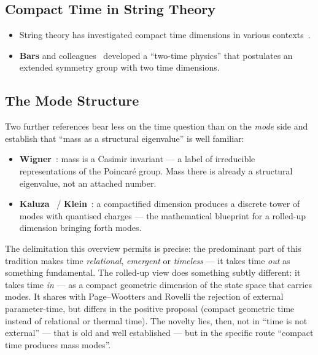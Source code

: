 \documentclass[11pt,a4paper]{article}
\begin{document}
\subsection{Compact Time in String Theory}
\begin{itemize}[leftmargin=1.4em,itemsep=0.25em]
 \item String theory has investigated compact time dimensions in various contexts~\cite{GreenSchwarzWitten1987,Polchinski1998}.
 \item \textbf{Bars} and colleagues~\cite{Bars1997,Bars2012} developed a ``two-time physics'' that postulates an extended symmetry group with two time dimensions.
\end{itemize}

\subsection{The Mode Structure}
Two further references bear less on the time question than on the \emph{mode} side and establish that ``mass as a structural eigenvalue'' is well familiar:
\begin{itemize}[leftmargin=1.4em,itemsep=0.25em]
 \item \textbf{Wigner}~\cite{Wigner1939}: mass is a Casimir invariant --- a label of irreducible representations of the Poincaré group. Mass there is already a structural eigenvalue, not an attached number.
 \item \textbf{Kaluza}~\cite{Kaluza1921} / \textbf{Klein}~\cite{Klein1926}: a compactified dimension produces a discrete tower of modes with quantised charges --- the mathematical blueprint for a rolled-up dimension bringing forth modes.
\end{itemize}

The delimitation this overview permits is precise: the predominant part of this tradition makes time \emph{relational}, \emph{emergent} or \emph{timeless} --- it takes time \emph{out} as something fundamental. The rolled-up view does something subtly different: it takes time \emph{in} --- as a compact geometric dimension of the state space that carries modes. It shares with Page--Wootters and Rovelli the rejection of external parameter-time, but differs in the positive proposal (compact geometric time instead of relational or thermal time). The novelty lies, then, not in ``time is not external'' --- that is old and well established --- but in the specific route ``compact time produces mass modes''.

\end{document}
